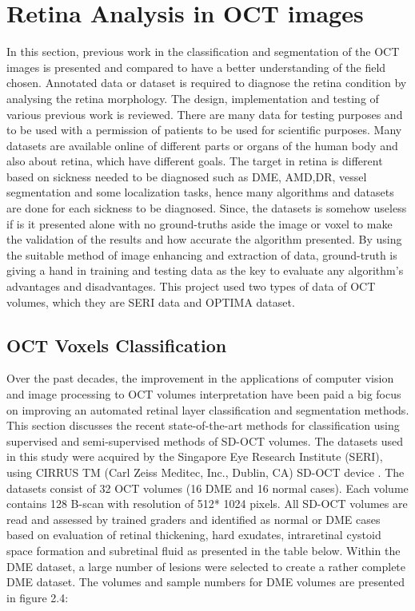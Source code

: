 \section{Retina Analysis in OCT images}

In this section, previous work in the classification and segmentation of the OCT images is presented and compared to have a better understanding of the field chosen.
Annotated data or dataset is required to diagnose the retina condition by analysing the retina morphology.
The design, implementation and testing of various previous work is reviewed.
There are many data for testing purposes and to be used with a permission of patients to be used for scientific purposes.
Many datasets are available online of different parts or organs of the human body and also about retina, which have different goals.
The target in retina is different based on sickness needed to be diagnosed such as DME, AMD,DR, vessel segmentation and some localization tasks, hence many algorithms and datasets are done for each sickness to be diagnosed.
Since, the datasets is somehow useless if is it presented alone with no ground-truths aside the image or voxel to make the validation of the results and how accurate the algorithm presented.
By using the suitable method of image enhancing and extraction of data, ground-truth is giving a hand in training and testing data as the key to evaluate any algorithm's advantages and disadvantages.
This project used two types of data of OCT volumes, which they are SERI data and OPTIMA dataset.

\subsection{OCT Voxels Classification}
Over the past decades, the improvement in the applications of computer vision and image processing to
OCT volumes interpretation have been paid a big focus on improving an automated retinal layer
classification and segmentation methods.
This section discusses the recent state-of-the-art methods for classification using supervised and semi-supervised methods of SD-OCT volumes.
The datasets used in this study were acquired by the Singapore Eye Research Institute (SERI), using CIRRUS TM (Carl Zeiss Meditec, Inc., Dublin, CA) SD-OCT device \cite{cense2006ultra}.
The datasets consist of 32 OCT volumes (16 DME and 16 normal cases).
Each volume contains 128 B-scan with resolution of 512* 1024 pixels.
All SD-OCT volumes are read and assessed by trained graders and identified as normal or DME cases based on evaluation of retinal thickening, hard exudates, intraretinal cystoid space formation and subretinal fluid as presented in the table below.
Within the DME dataset, a large number of lesions were selected to create a rather complete DME dataset.
The volumes and sample numbers for DME volumes are presented in figure 2.4:

